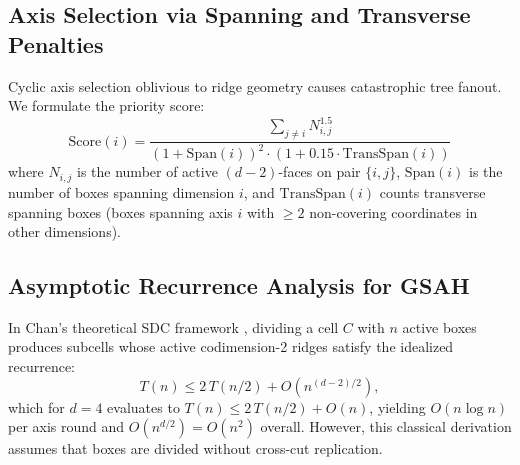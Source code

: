 \documentclass[11pt,a4paper]{article}
\theoremstyle{plain}
\theoremstyle{definition}
\begin{document}
\subsection{Axis Selection via Spanning and Transverse Penalties}
Cyclic axis selection oblivious to ridge geometry causes catastrophic tree fanout. We formulate the priority score:
\begin{equation}
\mathrm{Score}(i) = \frac{\sum_{j \ne i} N_{i, j}^{1.5}}{(1 + \mathrm{Span}(i))^2 \cdot (1 + 0.15 \cdot \mathrm{TransSpan}(i))}
\end{equation}
where $N_{i, j}$ is the number of active $(d-2)$-faces on pair $\{i, j\}$, $\mathrm{Span}(i)$ is the number of boxes spanning dimension $i$, and $\mathrm{TransSpan}(i)$ counts transverse spanning boxes (boxes spanning axis $i$ with $\ge 2$ non-covering coordinates in other dimensions).

\subsection{Asymptotic Recurrence Analysis for GSAH}
\label{sec:recurrence_analysis}

In Chan's theoretical SDC framework \cite{chan2013klee}, dividing a cell $C$ with $n$ active boxes produces subcells whose active codimension-2 ridges satisfy the idealized recurrence:
\begin{equation}
T(n) \le 2\, T(n/2) + O\left(n^{(d-2)/2}\right),
\end{equation}
which for $d=4$ evaluates to $T(n) \le 2\, T(n/2) + O(n)$, yielding $O(n \log n)$ per axis round and $O(n^{d/2}) = O(n^2)$ overall. However, this classical derivation assumes that boxes are divided without cross-cut replication.
\end{document}
